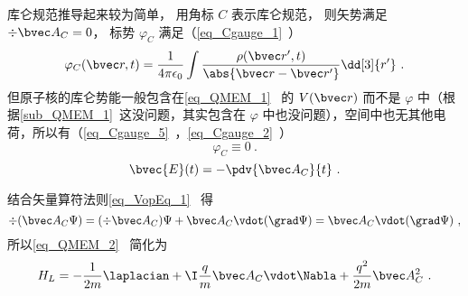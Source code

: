 
\begin{issues}
\issueDraft
\end{issues}


库仑规范推导起来较为简单， 用角标 $C$ 表示库仑规范， 则矢势满足 $\div \bvec A_C = 0$， 标势 $\varphi_C$ 满足（\autoref{eq_Cgauge_1}~）
\begin{equation}
\varphi_C(\bvec r, t) = \frac{1}{4\pi\epsilon_0} \int \frac{\rho(\bvec r', t)}{\abs{\bvec r - \bvec r'}} \dd[3]{r'}~.
\end{equation}
但原子核的库仑势能一般包含在\autoref{eq_QMEM_1}~ 的 $V(\bvec r)$ 而不是 $\varphi$ 中（根据\autoref{sub_QMEM_1}~这没问题，其实包含在 $\varphi$ 中也没问题），空间中也无其他电荷，所以有（\autoref{eq_Cgauge_5}~，\autoref{eq_Cgauge_2}~）
\begin{equation}
\varphi_C \equiv 0~.
\end{equation}
\begin{equation}
\bvec {E}(t) = -\pdv{\bvec A_C}{t}~.
\end{equation}

结合矢量算符法则\autoref{eq_VopEq_1}~ 得
\begin{equation}
\div (\bvec A_C \Psi) = (\div \bvec A_C) \Psi + \bvec A_C \vdot (\grad \Psi) = \bvec A_C \vdot (\grad \Psi)~,
\end{equation}
所以\autoref{eq_QMEM_2}~ 简化为
\begin{equation}\label{eq_CouGau_4}
H_L = -\frac{1}{2m} \laplacian + \I \frac{q}{m} \bvec A_C \vdot \Nabla + \frac{q^2}{2m} \bvec A_C^2~.
\end{equation}
